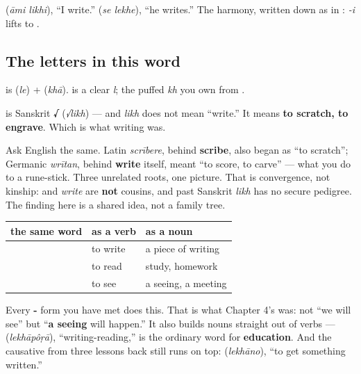   (\emph{āmi likhi}), \textquotedblleft{}I write.\textquotedblright{}   (\emph{se lekhe}), \textquotedblleft{}he writes.\textquotedblright{} The harmony, written down as in : \emph{-i} lifts \textbf{} to \textbf{}.

\subsection*{The letters in this word}
\textbf{} is \textbf{} (\emph{le}) + \textbf{} (\emph{khā}). \textbf{} is a clear \emph{l}; \textbf{} the puffed \emph{kh} you own from .

\begin{cousinweb}
\textbf{} is Sanskrit \textbf{√} (\emph{√likh}) — and \emph{likh} does not mean \textquotedblleft{}write.\textquotedblright{} It means \textbf{to scratch, to engrave}. Which is what writing was.

Ask English the same. Latin \emph{scrībere}, behind \textbf{scribe}, also began as \textquotedblleft{}to scratch\textquotedblright{}; Germanic \emph{wrītan}, behind \textbf{write} itself, meant \textquotedblleft{}to score, to carve\textquotedblright{} — what you do to a rune-stick. Three unrelated roots, one picture. That is convergence, not kinship:  and \emph{write} are \textbf{not} cousins, and past Sanskrit \emph{likh} has no secure pedigree. The finding here is a shared idea, not a family tree.
\end{cousinweb}

\begin{grammarlens}[title={Grammar Lens: the dictionary form is also a noun}]
\noindent
\begin{tabularx}{\linewidth}{@{}>{\raggedright\arraybackslash}X>{\raggedright\arraybackslash}X>{\raggedright\arraybackslash}X@{}}
\toprule
\textbf{the same word} & \textbf{as a verb} & \textbf{as a noun} \\
\midrule
\bn{লেখা} & to write & a piece of writing \\
\bn{পড়া} & to read & study, homework \\
\bn{দেখা} & to see & a seeing, a meeting \\
\bottomrule
\end{tabularx}

Every \textbf{-} form you have met does this. That is what Chapter 4's \textbf{ } was: not \textquotedblleft{}we will see\textquotedblright{} but \textquotedblleft{}\textbf{a seeing} will happen.\textquotedblright{} It also builds nouns straight out of verbs — \textbf{} (\emph{lekhāpôṛā}), \textquotedblleft{}writing-reading,\textquotedblright{} is the ordinary word for \textbf{education}. And the causative from three lessons back still runs on top: \textbf{} (\emph{lekhāno}), \textquotedblleft{}to get something written.\textquotedblright{}
\end{grammarlens}

